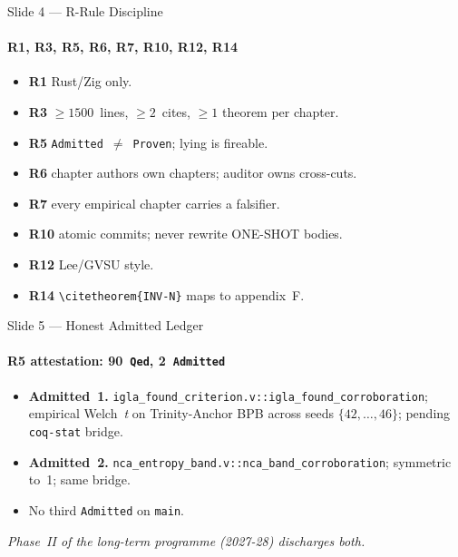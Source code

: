 \documentclass[10pt,aspectratio=169]{beamer}
\begin{document}
\begin{frame}{Slide 4 — R-Rule Discipline}
  \framesubtitle{R1, R3, R5, R6, R7, R10, R12, R14}
  \begin{itemize}
    \item \textbf{R1} Rust/Zig only.
    \item \textbf{R3} \(\ge 1500\)~lines, \(\ge 2\)~cites, \(\ge 1\)
      theorem per chapter.
    \item \textbf{R5} \texttt{Admitted}~\(\ne\)~\texttt{Proven}; lying
      is fireable.
    \item \textbf{R6} chapter authors own chapters; auditor owns
      cross-cuts.
    \item \textbf{R7} every empirical chapter carries a falsifier.
    \item \textbf{R10} atomic commits; never rewrite ONE-SHOT bodies.
    \item \textbf{R12} Lee/GVSU style.
    \item \textbf{R14} \texttt{\textbackslash citetheorem\{INV-N\}} maps
      to appendix~F.
  \end{itemize}
\end{frame}

\begin{frame}{Slide 5 — Honest Admitted Ledger}
  \framesubtitle{R5 attestation: 90~\texttt{Qed}, 2~\texttt{Admitted}}
  \begin{itemize}
    \item \textbf{Admitted~1.}
      \texttt{igla\_found\_criterion.v::igla\_found\_corroboration};
      empirical Welch~\textit{t} on Trinity-Anchor BPB across seeds
      \(\{42, \ldots, 46\}\); pending \texttt{coq-stat} bridge.
    \item \textbf{Admitted~2.}
      \texttt{nca\_entropy\_band.v::nca\_band\_corroboration};
      symmetric to~1; same bridge.
    \item No third \texttt{Admitted} on \texttt{main}.
  \end{itemize}
  \vfill
  \footnotesize\emph{Phase~II of the long-term programme (2027-28) discharges both.}
\end{frame}

\end{document}
